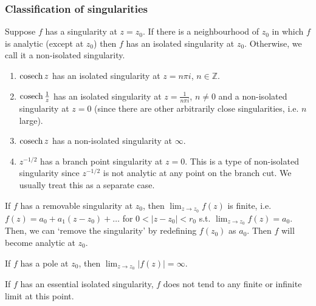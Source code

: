 \documentclass[a4paper]{article}
\begin{document}
\subsubsection{Classification of singularities}
\begin{defi}
Suppose $f$ has a singularity at $z=z_0$. If there is a neighbourhood of $z_0$ in which $f$ is analytic (except at $z_0$) then $f$ has an isolated singularity at $z_0$. Otherwise, we call it a non-isolated singularity.
\end{defi}
\begin{eg}\leavevmode
\begin{enumerate}
    \item $\operatorname{cosech} z$ has an isolated singularity at $z=n\pi i$, $n\in\mathbb{Z}$.
    \item $\operatorname{cosech}\frac{1}{z}$ has an isolated singularity at $z=\frac{1}{n\pi i}$, $n\neq 0$ and a non-isolated singularity at $z=0$ (since there are other arbitrarily close singularities, i.e. $n$ large).
    \item $\operatorname{cosech} z$ has a non-isolated singularity at $\infty$.
    \item $z^{-1/2}$ has a branch point singularity at $z=0$. This is a type of non-isolated singularity since $z^{-1/2}$ is not analytic at any point on the branch cut. We usually treat this as a separate case.
\end{enumerate}
\end{eg}
\begin{defi}
If $f$ has a removable singularity at $z_0$, then $\lim_{z\rightarrow z_0}f(z)$ is finite, i.e. $f(z)=a_0+a_1(z-z_0)+\dots$ for $0<|z-z_0|<r_0$ s.t. $\lim_{z\rightarrow z_0}f(z)=a_0$. Then, we can `remove the singularity' by redefining $f(z_0)$ as $a_0$. Then $f$ will become analytic at $z_0$.
\end{defi}
\begin{defi}[Pole]
If $f$ has a pole at $z_0$, then $\lim_{z\rightarrow z_0}|f(z)|=\infty$.
\end{defi}
\begin{defi}
If $f$ has an essential isolated singularity, $f$ does not tend to any finite or infinite limit at this point.
\end{defi}
\end{document}
